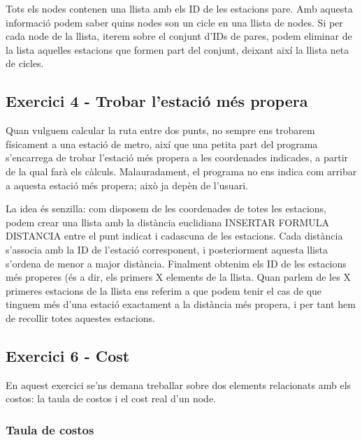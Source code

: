 \documentclass[a4paper,12pt]{article}
\begin{document}
            Tots els nodes contenen una llista amb els ID de les estacions pare. Amb aquesta informació podem saber quins nodes son un cicle en una llista de nodes. Si per cada node de la llista, iterem sobre el conjunt d’IDs de pares, podem eliminar de la lista aquelles estacions que formen part del conjunt, deixant així la llista neta de cicles.


        \subsection*{Exercici 4 - Trobar l’estació més propera}

            Quan vulguem calcular la ruta entre dos punts, no sempre ens trobarem físicament a una estació de metro, així que una petita part del programa s’encarrega de trobar l’estació més propera a les coordenades indicades, a partir de la qual farà els càlculs. Malauradament, el programa no ens indica com arribar a aquesta estació més propera; això ja depèn de l’usuari.

            La idea és senzilla: com disposem de les coordenades de totes les estacions, podem crear una llista amb la distància euclidiana INSERTAR FORMULA DISTANCIA entre el punt indicat i cadascuna de les estacions. Cada distància s’associa amb la ID de l’estació corresponent, i posteriorment aquesta llista s’ordena de menor a major distància. Finalment obtenim els ID de les estacions més properes (és a dir, els primers X elements de la llista.
            Quan parlem de les X primeres estacions de la llista ens referim a que podem tenir el cas de que tinguem més d’una estació exactament a la distància més propera, i per tant hem de recollir totes aquestes estacions.
            

        \subsection*{Exercici 6 - Cost}

        En aquest exercici se'ns demana treballar sobre dos elements relacionats amb els costos: la taula de costos i el cost real d’un node.
        
            \subsubsection*{Taula de costos}
\end{document}
